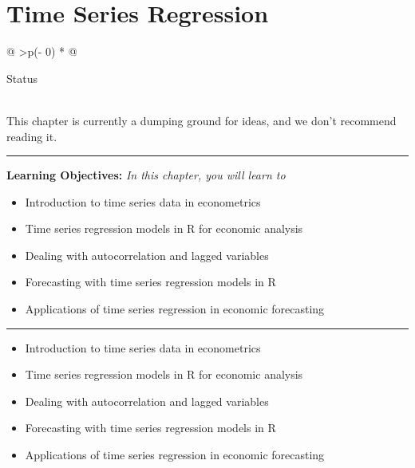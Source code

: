 \documentclass[
  letterpaper,
  paper =a4,
  twoside,
  openright,
  headsepline,
  footsepline,
  listof = totocnumbered,
  chapterprefix = true,
  firstiscover]{scrbook}
\providecommand{\abstractname}{Learning Objectives} %
\newenvironment{objectives}[1]{%
	\hrule
	\vspace{5pt}
	\small\textbf{\abstractname: } 
	\newline
	\vspace{0.1cm}
	\small\emph{#1} %
	\itshape %
}{%
	\vspace{5pt}
	\hrule
	\vspace{0.6cm}
}
\begin{document}

\hypertarget{time-series-regression}{%
\chapter{Time Series Regression}\label{time-series-regression}}

\begin{longtable}[]{@{}
  >{\centering\arraybackslash}p{(\columnwidth - 0\tabcolsep) * }@{}}
\toprule\noalign{}
\begin{minipage}[b]{\linewidth}\centering
Status
\end{minipage} \\
\midrule\noalign{}
\endhead
\bottomrule\noalign{}
\endlastfoot
This chapter is currently a dumping ground for ideas, and we don't
recommend reading it. \\
\end{longtable}

\begin{objectives}{In this chapter, you will learn to}
\begin{itemize}

\item{Introduction to time series data in econometrics}

\item{Time series regression models in R for economic analysis}

\item{Dealing with autocorrelation and lagged variables}

\item{Forecasting with time series regression models in R}

\item{Applications of time series regression in economic forecasting}

\end{itemize}

\end{objectives}

\begin{itemize}
\item
  Introduction to time series data in econometrics
\item
  Time series regression models in R for economic analysis
\item
  Dealing with autocorrelation and lagged variables
\item
  Forecasting with time series regression models in R
\item
  Applications of time series regression in economic forecasting
\end{itemize}
\end{document}
